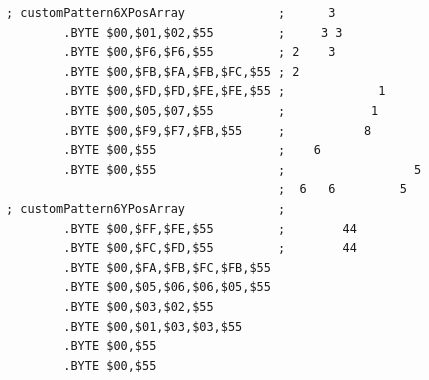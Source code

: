 \begin{lstlisting}
; customPattern6XPosArray             ;      3            
        .BYTE $00,$01,$02,$55         ;     3 3           
        .BYTE $00,$F6,$F6,$55         ; 2    3            
        .BYTE $00,$FB,$FA,$FB,$FC,$55 ; 2                 
        .BYTE $00,$FD,$FD,$FE,$FE,$55 ;             1     
        .BYTE $00,$05,$07,$55         ;            1      
        .BYTE $00,$F9,$F7,$FB,$55     ;           8       
        .BYTE $00,$55                 ;    6              
        .BYTE $00,$55                 ;                  5
                                      ;  6   6         5  
; customPattern6YPosArray             ;                   
        .BYTE $00,$FF,$FE,$55         ;        44         
        .BYTE $00,$FC,$FD,$55         ;        44         
        .BYTE $00,$FA,$FB,$FC,$FB,$55
        .BYTE $00,$05,$06,$06,$05,$55
        .BYTE $00,$03,$02,$55
        .BYTE $00,$01,$03,$03,$55
        .BYTE $00,$55
        .BYTE $00,$55
\end{lstlisting}


